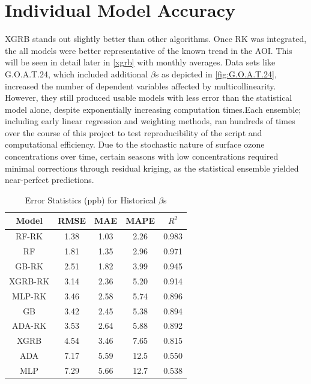 \section{Individual Model Accuracy} \label{rlts:modelacc} XGRB stands out slightly better than other algorithms. Once RK was integrated, the all models were better representative of the known trend in the AOI. This will be seen in detail later in \ref{xgrb} with monthly averages. Data sets like G.O.A.T.24, which included additional $\beta$s as depicted in \ref{fig:G.O.A.T.24}, increased the number of dependent variables affected by multicollinearity. However, they still produced usable models with less error than the statistical model alone, despite exponentially increasing computation times.Each ensemble; including early linear regression and weighting methods, ran hundreds of times over the course of this project to test reproducibility of the script and computational efficiency. Due to the stochastic nature of surface ozone concentrations over time, certain seasons with low concentrations required minimal corrections through residual kriging, as the statistical ensemble yielded near-perfect predictions. \begin{table}[h!]
    \centering
        \begin{tabular}{||c|cccc||}
            \hline 
            \textbf{Model}	& \textbf{RMSE} & \textbf{MAE} & \textbf{MAPE} & \textbf{$R^{2}$} \\
            \hline \hline 
             RF-RK & 1.38 & 1.03 &  2.26 & 0.983 \\[3pt]
                RF & 1.81 & 1.35 &  2.96 & 0.971 \\[3pt]
             GB-RK & 2.51 & 1.82 &  3.99 & 0.945 \\[3pt]
            XGRB-RK & 3.14 & 2.36 &  5.20 & 0.914 \\[3pt]
            MLP-RK & 3.46 & 2.58 &  5.74 & 0.896 \\[3pt]
                GB & 3.42 & 2.45 &  5.38 & 0.894 \\[3pt]
            ADA-RK & 3.53 & 2.64 &  5.88 & 0.892 \\[3pt]
              XGRB & 4.54 & 3.46 &  7.65 & 0.815 \\[3pt]
               ADA & 7.17 & 5.59 & 12.5  & 0.550 \\[3pt]
               MLP & 7.29 & 5.66 & 12.7  & 0.538 \\
            \hline
        \end{tabular}
    \caption{Error Statistics (ppb) for Historical $\beta$s} 

\end{table}

